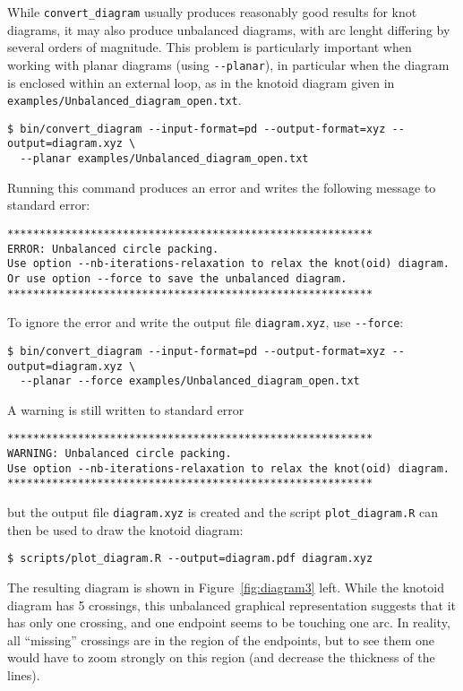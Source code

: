 While \lstinline{convert_diagram} usually produces reasonably good results for knot diagrams, it may also produce unbalanced diagrams, with arc lenght differing by several orders of magnitude.
This problem is particularly important when working with planar diagrams (using \lstinline{--planar}), in particular when the diagram is enclosed within an external loop, as in the knotoid diagram given in \lstinline{examples/Unbalanced_diagram_open.txt}.
\begin{lstlisting}
$ bin/convert_diagram --input-format=pd --output-format=xyz --output=diagram.xyz \
  --planar examples/Unbalanced_diagram_open.txt
\end{lstlisting}
Running this command produces an error and writes the following message to standard error:
\begin{lstlisting}
*********************************************************
ERROR: Unbalanced circle packing.
Use option --nb-iterations-relaxation to relax the knot(oid) diagram.
Or use option --force to save the unbalanced diagram.
*********************************************************
\end{lstlisting}
To ignore the error and write the output file \lstinline{diagram.xyz}, use \lstinline{--force}:
\begin{lstlisting}
$ bin/convert_diagram --input-format=pd --output-format=xyz --output=diagram.xyz \
  --planar --force examples/Unbalanced_diagram_open.txt
\end{lstlisting}
A warning is still written to standard error
\begin{lstlisting}
*********************************************************
WARNING: Unbalanced circle packing.
Use option --nb-iterations-relaxation to relax the knot(oid) diagram.
*********************************************************
\end{lstlisting}
but the output file \lstinline{diagram.xyz} is created and the script \lstinline{plot_diagram.R} can then be used to draw the knotoid diagram:
\begin{lstlisting}
$ scripts/plot_diagram.R --output=diagram.pdf diagram.xyz
\end{lstlisting}
The resulting diagram is shown in Figure~\ref{fig:diagram3} left. While the knotoid diagram has 5 crossings, this unbalanced graphical representation suggests that it has only one crossing, and one endpoint seems to be touching one arc. In reality, all ``missing'' crossings are in the region of the endpoints, but to see them one would have to zoom strongly on this region (and decrease the thickness of the lines).

